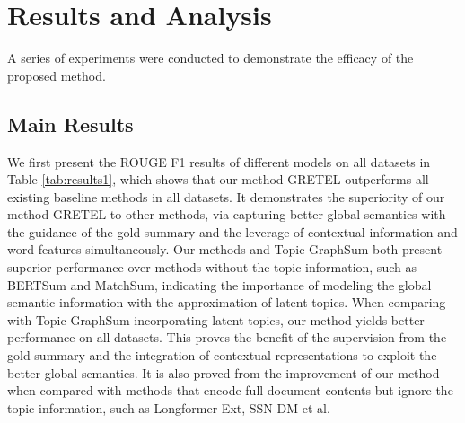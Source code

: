 \documentclass[11pt]{article}
\begin{document}
\section{Results and Analysis}
A series of experiments were conducted to demonstrate the efficacy of the proposed method.

\subsection{Main Results}
We first present the ROUGE F1 results of different models on all datasets in Table \ref{tab:results1}, which shows that our method GRETEL outperforms all existing baseline methods in all datasets.
It demonstrates the superiority of our method GRETEL to other methods, via capturing better global semantics with the guidance of the gold summary and the leverage of contextual information and word features simultaneously.
Our methods and Topic-GraphSum both present superior performance over methods without the topic information, such as BERTSum and MatchSum, indicating the importance of modeling the global semantic information with the approximation of latent topics.
When comparing with Topic-GraphSum incorporating latent topics, our method yields better performance on all datasets.
This proves the benefit of the supervision from the gold summary and the integration of contextual representations to exploit the better global semantics.
It is also proved from the improvement of our method when compared with methods that encode full document contents but ignore the topic information, such as Longformer-Ext, SSN-DM et al.
\end{document}
